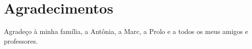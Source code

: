 
\chapter*{Agradecimentos}

Agradeço à minha família, a Antônia, a Marc, a Prolo e a todos os meus amigos e professores.
